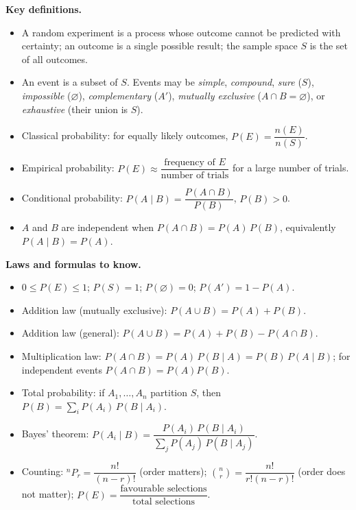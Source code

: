 \documentclass[11pt]{article}
\newcommand{\cle}[1]{{\popxbold\color{popdark}#1}}
\begin{document}
\begin{bilan}
\textbf{Key definitions.}
\begin{itemize}
\item A \cle{random experiment} is a process whose outcome cannot be predicted with certainty; an \cle{outcome} is a single possible result; the \cle{sample space} $S$ is the set of all outcomes.
\item An \cle{event} is a subset of $S$. Events may be \emph{simple}, \emph{compound}, \emph{sure} ($S$), \emph{impossible} ($\varnothing$), \emph{complementary} ($A'$), \emph{mutually exclusive} ($A\cap B=\varnothing$), or \emph{exhaustive} (their union is $S$).
\item \cle{Classical probability}: for equally likely outcomes, $P(E)=\dfrac{n(E)}{n(S)}$.
\item \cle{Empirical probability}: $P(E)\approx \dfrac{\text{frequency of }E}{\text{number of trials}}$ for a large number of trials.
\item \cle{Conditional probability}: $P(A\mid B)=\dfrac{P(A\cap B)}{P(B)}$, $P(B)>0$.
\item $A$ and $B$ are \cle{independent} when $P(A\cap B)=P(A)\,P(B)$, equivalently $P(A\mid B)=P(A)$.
\end{itemize}

\textbf{Laws and formulas to know.}
\begin{itemize}
\item $0\le P(E)\le 1$; $P(S)=1$; $P(\varnothing)=0$; $P(A')=1-P(A)$.
\item Addition law (mutually exclusive): $P(A\cup B)=P(A)+P(B)$.
\item Addition law (general): $P(A\cup B)=P(A)+P(B)-P(A\cap B)$.
\item Multiplication law: $P(A\cap B)=P(A)\,P(B\mid A)=P(B)\,P(A\mid B)$; for independent events $P(A\cap B)=P(A)P(B)$.
\item Total probability: if $A_1,\dots,A_n$ partition $S$, then $P(B)=\sum_i P(A_i)\,P(B\mid A_i)$.
\item Bayes' theorem: $P(A_i\mid B)=\dfrac{P(A_i)\,P(B\mid A_i)}{\sum_j P(A_j)\,P(B\mid A_j)}$.
\item Counting: ${}^nP_r=\dfrac{n!}{(n-r)!}$ (order matters); $\binom{n}{r}=\dfrac{n!}{r!(n-r)!}$ (order does not matter); $P(E)=\dfrac{\text{favourable selections}}{\text{total selections}}$.
\end{itemize}


\end{bilan}
\end{document}
